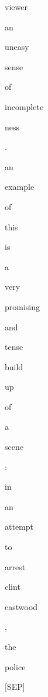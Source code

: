 \documentclass[varwidth=150mm]{standalone}
\begin{document}
\begin{CJK*}{UTF8}{gbsn}
{{{\colorbox{red!2.736027240753174}{\strut viewer} \colorbox{red!3.1012628078460693}{\strut an} \colorbox{red!4.335666179656982}{\strut uneasy} \colorbox{red!0.0}{\strut sense} \colorbox{red!0.0}{\strut of} \colorbox{red!11.386560440063477}{\strut incomplete}\colorbox{red!1.5514309406280518}{\strut ness} \colorbox{red!0.0}{\strut .} \colorbox{red!6.180481910705566}{\strut an} \colorbox{red!8.04118537902832}{\strut example} \colorbox{red!3.5808262825012207}{\strut of} \colorbox{red!15.091218948364258}{\strut this} \colorbox{red!8.175790786743164}{\strut is} \colorbox{red!25.78099250793457}{\strut a} \colorbox{red!5.622152805328369}{\strut very} \colorbox{red!10.05242919921875}{\strut promising} \colorbox{red!4.977683067321777}{\strut and} \colorbox{red!6.004463195800781}{\strut tense} \colorbox{red!3.445249080657959}{\strut build}\colorbox{red!26.30923080444336}{\strut up} \colorbox{red!4.237189292907715}{\strut of} \colorbox{red!10.358434677124023}{\strut a} \colorbox{red!51.485321044921875}{\strut scene} \colorbox{red!19.621252059936523}{\strut :} \colorbox{red!3.6353254318237305}{\strut in} \colorbox{red!4.963190078735352}{\strut an} \colorbox{red!2.4520223140716553}{\strut attempt} \colorbox{red!0.0}{\strut to} \colorbox{red!24.980327606201172}{\strut arrest} \colorbox{red!8.647469520568848}{\strut clint} \colorbox{red!54.399085998535156}{\strut eastwood} \colorbox{red!2.1648998260498047}{\strut ,} \colorbox{red!22.261993408203125}{\strut the} \colorbox{red!54.791236877441406}{\strut police} \colorbox{red!1.3760112524032593}{\strut [SEP]}
}}}
\end{CJK*}
\end{document}
